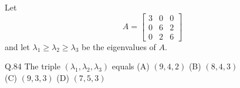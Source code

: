 \documentclass{article}
\begin{document}
																																																																																																																																	  Let
																																																																																																																																	  \[
																																																																																																																																	  A = \begin{bmatrix}
																																																																																																																																	  3 & 0 & 0 \\
																																																																																																																																	  0 & 6 & 2 \\
																																																																																																																																	  0 & 2 & 6
																																																																																																																																	  \end{bmatrix}
																																																																																																																																	  \]
																																																																																																																																	  and let $\lambda_1 \geq \lambda_2 \geq \lambda_3$ be the eigenvalues of $A$.

																																																																																																																																	  Q.84 \quad The triple $(\lambda_1, \lambda_2, \lambda_3)$ equals  
																																																																																																																																	  \newline
																																																																																																																																	  (A) $(9, 4, 2)$ \hspace{2cm} (B) $(8, 4, 3)$ \hspace{2cm} \\ (C) $(9, 3, 3)$ \hspace{2cm} (D) $(7, 5, 3)$
																																																																																																																																	  \vspace{1em} \newline

																																																																																																																																	  \bigskip
\end{document}
